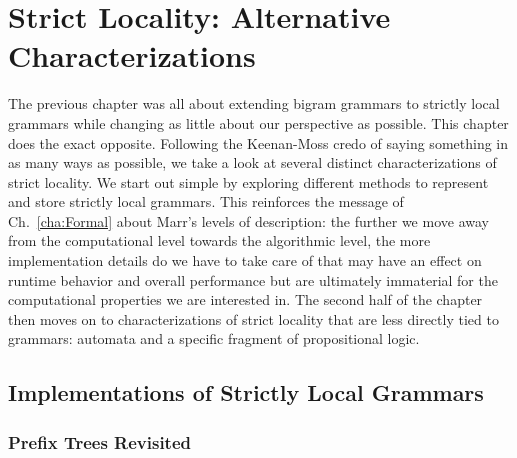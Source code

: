 \chapter{Strict Locality: Alternative Characterizations}
\label{cha:SLImplement}

The previous chapter was all about extending bigram grammars to strictly local grammars while changing as little about our perspective as possible.
This chapter does the exact opposite.
Following the Keenan-Moss credo of saying something in as many ways as possible, we take a look at several distinct characterizations of strict locality.
We start out simple by exploring different methods to represent and store strictly local grammars.
This reinforces the message of Ch.~\ref{cha:Formal} about Marr's levels of description: the further we move away from the computational level towards the algorithmic level, the more implementation details do we have to take care of that may have an effect on runtime behavior and overall performance but are ultimately immaterial for the computational properties we are interested in.
The second half of the chapter then moves on to characterizations of strict locality that are less directly tied to grammars: automata and a specific fragment of propositional logic. 

\section{Implementations of Strictly Local Grammars}

\subsection{Prefix Trees Revisited}

